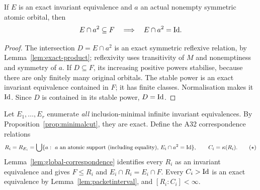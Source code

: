 \begin{lemma}
\label{lem:acf-finite-exact-intersection}
If \(E\) is an exact invariant equivalence and \(a\) an actual
nonempty symmetric atomic orbital, then
\[
 E\cap a^2\subseteq F\quad\Longrightarrow\quad
 E\cap a^2=\mathrm{Id}.
\]
\end{lemma}
\begin{proof}
The intersection \(D=E\cap a^2\) is an exact symmetric
reflexive relation, by Lemma~\ref{lem:exact-product};
reflexivity uses transitivity of \(M\) and nonemptiness and
symmetry of \(a\).  If \(D\subseteq F\), its increasing positive
powers stabilise, because there are only finitely many original
orbitals.  The stable power is an exact invariant equivalence
contained in \(F\); it has finite classes.  Normalisation makes
it \(\mathrm{Id}\).  Since \(D\) is contained in its stable power,
\(D=\mathrm{Id}\).
\end{proof}

Let \(E_1,\ldots,E_r\) enumerate \emph{all} inclusion-minimal
infinite invariant equivalences.  By
Proposition~\ref{prop:minimalcut}, they are exact.  Define the
A32 correspondence relations
\[
 R_i=R_{E_i}
  =\bigcup\{a:\ a\text{ an atomic support (including equality), }
                         E_i\cap a^2=\mathrm{Id}\},
 \qquad C_i=\kappa(R_i).
 \tag{\(\star\)}\label{eq:acf-correspondence}
\]
Lemma~\ref{lem:global-correspondence} identifies every \(R_i\)
as an invariant equivalence and gives
\(F\le R_i\) and \(E_i\cap R_i=E_i\cap F\).
Every \(C_i>\mathrm{Id}\) is an exact equivalence by
Lemma~\ref{lem:packetinterval}, and
\([R_i:C_i]<\infty\).

